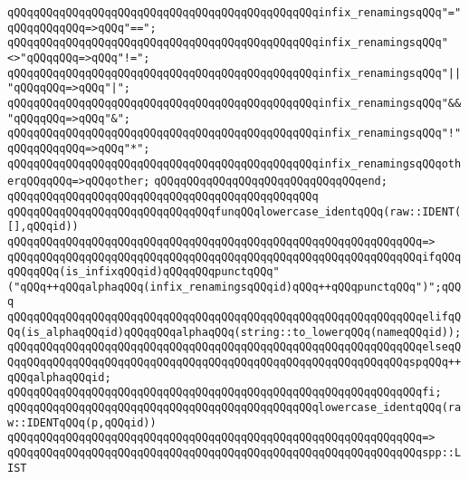 \verb|qQQqqQQqqQQqqQQqqQQqqQQqqQQqqQQqqQQqqQQqqQQqqQQqinfix_renamingsqQQq"="qQQqqQQqqQQq=>qQQq"==";|\newline
\verb|qQQqqQQqqQQqqQQqqQQqqQQqqQQqqQQqqQQqqQQqqQQqqQQqinfix_renamingsqQQq"<>"qQQqqQQq=>qQQq"!=";|\newline
\verb|qQQqqQQqqQQqqQQqqQQqqQQqqQQqqQQqqQQqqQQqqQQqqQQqinfix_renamingsqQQq"|\verb#||"qQQqqQQq=>qQQq"|";#\newline
\verb|qQQqqQQqqQQqqQQqqQQqqQQqqQQqqQQqqQQqqQQqqQQqqQQqinfix_renamingsqQQq"&&"qQQqqQQq=>qQQq"&";|\newline
\verb|qQQqqQQqqQQqqQQqqQQqqQQqqQQqqQQqqQQqqQQqqQQqqQQqinfix_renamingsqQQq"!"qQQqqQQqqQQq=>qQQq"*";|\newline
\verb|qQQqqQQqqQQqqQQqqQQqqQQqqQQqqQQqqQQqqQQqqQQqqQQqinfix_renamingsqQQqotherqQQqqQQq=>qQQqother;|\newline
\verb|qQQqqQQqqQQqqQQqqQQqqQQqqQQqqQQqend;|\newline
\verb|qQQqqQQqqQQqqQQqqQQqqQQqqQQqqQQqqQQqqQQqqQQqqQQq|\newline
\newline
\verb|qQQqqQQqqQQqqQQqqQQqqQQqqQQqqQQqfunqQQqlowercase_identqQQq(raw::IDENT([],qQQqid))|\newline
\verb|qQQqqQQqqQQqqQQqqQQqqQQqqQQqqQQqqQQqqQQqqQQqqQQqqQQqqQQqqQQqqQQq=>|\newline
\verb|qQQqqQQqqQQqqQQqqQQqqQQqqQQqqQQqqQQqqQQqqQQqqQQqqQQqqQQqqQQqqQQqifqQQqqQQqqQQq(is_infixqQQqid)qQQqqQQqpunctqQQq"("qQQq++qQQqalphaqQQq(infix_renamingsqQQqid)qQQq++qQQqpunctqQQq")";qQQq|\newline
\verb|qQQqqQQqqQQqqQQqqQQqqQQqqQQqqQQqqQQqqQQqqQQqqQQqqQQqqQQqqQQqqQQqelifqQQq(is_alphaqQQqid)qQQqqQQqalphaqQQq(string::to_lowerqQQq(nameqQQqid));|\newline
\verb|qQQqqQQqqQQqqQQqqQQqqQQqqQQqqQQqqQQqqQQqqQQqqQQqqQQqqQQqqQQqqQQqelseqQQqqQQqqQQqqQQqqQQqqQQqqQQqqQQqqQQqqQQqqQQqqQQqqQQqqQQqqQQqqQQqspqQQq++qQQqalphaqQQqid;|\newline
\verb|qQQqqQQqqQQqqQQqqQQqqQQqqQQqqQQqqQQqqQQqqQQqqQQqqQQqqQQqqQQqqQQqfi;|\newline
\newline
\verb|qQQqqQQqqQQqqQQqqQQqqQQqqQQqqQQqqQQqqQQqqQQqqQQqlowercase_identqQQq(raw::IDENTqQQq(p,qQQqid))|\newline
\verb|qQQqqQQqqQQqqQQqqQQqqQQqqQQqqQQqqQQqqQQqqQQqqQQqqQQqqQQqqQQqqQQq=>|\newline
\verb|qQQqqQQqqQQqqQQqqQQqqQQqqQQqqQQqqQQqqQQqqQQqqQQqqQQqqQQqqQQqqQQqspp::LIST|\newline

